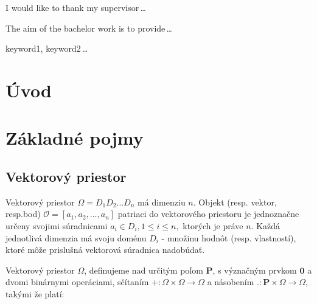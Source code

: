 \documentclass[12pt,oneside]{fithesis2}
\begin{document}
  \FrontMatter                    %
    \ThesisTitlePage                %
    \begin{ThesisDeclaration}       %
      \DeclarationText
      \AdvisorName
    \end{ThesisDeclaration}
    \begin{ThesisThanks}            %
      I would like to thank my supervisor\,\dots
    \end{ThesisThanks}
    \begin{ThesisAbstract}          %
      The aim of the bachelor work is to provide\,\dots
    \end{ThesisAbstract}
    \begin{ThesisKeyWords}          %
      keyword1, keyword2\,\dots
    \end{ThesisKeyWords}
    \tableofcontents                %
  
  \MainMatter                     %
    \chapter{Úvod}          %
    
    \chapter{Základné pojmy}
    
    	\section{Vektorový priestor}
    Vektorový priestor $ \Omega = D_1D_2. . .D_n $ má dimenziu $n$. Objekt (resp. vektor, resp.bod)  $\mathcal{O} = [a_1, a_2, . . . , a_n] $ patriaci do vektorového priestoru je jednoznačne určeny svojimi súradnicami $ a_i \in D_i, 1 \le i \le n, $ ktorých je práve $n$. Každá jednotlivá dimenzia má svoju doménu $D_i$ - množinu hodnôt (resp. vlastností), ktoré môže prislušná vektorová súradnica nadobúdať.
    	
    Vektorový priestor $\Omega$, definujeme nad určitým poľom $\mathbf{P} $, s význačným prvkom $\mathbf{0}$ a dvomi binárnymi operáciami, sčítaním $+ : \Omega \times \Omega \rightarrow \Omega $  a násobením $. : \mathbf{P}  \times \Omega \rightarrow \Omega$, takými že platí: 
     
\end{document}
